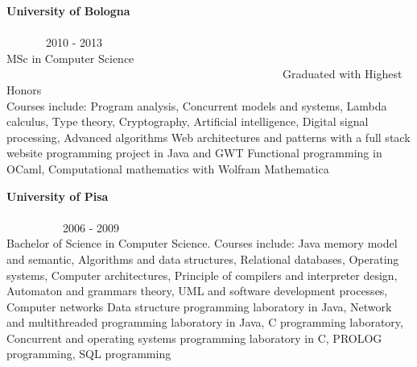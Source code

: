 \begin{resume}
        \textbf{University of Bologna} \ \ \ \ \ \ \ \ \ \ \ \ \ \ \ \ \ \ \ \ \ \ \ \ \ \ \ \ \ \ \ \ \ \ \ \ \ \ \ \ \ \ \ \ \ \ \ \ \ \ \ \ \ \ \ \ \ \ \ \ \ \ \ \ \ \ \ \ \ \ \ \ \ \ \ \ \ \ \ 2010 - 2013 \\
        MSc in Computer Science  \ \ \ \ \ \ \ \ \ \ \ \ \ \ \ \ \ \ \ \ \ \ \ \ \ \ \ \ \ \ \ \ \ \ \ \ \ \ \ \ \ \ \ \ \ \ \ \ \ Graduated with Highest Honors\\
        Courses include:
        Program analysis,
        Concurrent models and systems,
        Lambda calculus,
        Type theory,
        Cryptography,
        Artificial intelligence,
        Digital signal processing,
        Advanced algorithms
        Web architectures and patterns with a full stack website programming project in Java and GWT
        Functional programming in OCaml,
        Computational mathematics with Wolfram Mathematica

        \textbf{University of Pisa} \ \ \ \ \ \ \ \ \ \ \ \ \ \ \ \ \ \ \ \ \ \ \ \ \ \ \ \ \ \ \ \ \ \ \ \ \ \ \ \ \ \ \ \ \ \ \ \ \ \ \ \ \ \ \ \ \ \ \ \ \ \ \ \ \ \ \ \ \ \ \ \ \ \ \ \ \ \ \ \ \ \ 2006 - 2009 \\
        Bachelor of Science in Computer Science. Courses include:
        Java memory model and semantic,
        Algorithms and data structures,
        Relational databases,
        Operating systems,
        Computer architectures,
        Principle of compilers and interpreter design,
        Automaton and grammars theory,
        UML and software development processes,
        Computer networks
        Data structure programming laboratory in Java,
        Network and multithreaded programming laboratory in Java,
        C programming laboratory,
        Concurrent and operating systems programming laboratory in C,
        PROLOG programming,
        SQL programming




\end{resume}
